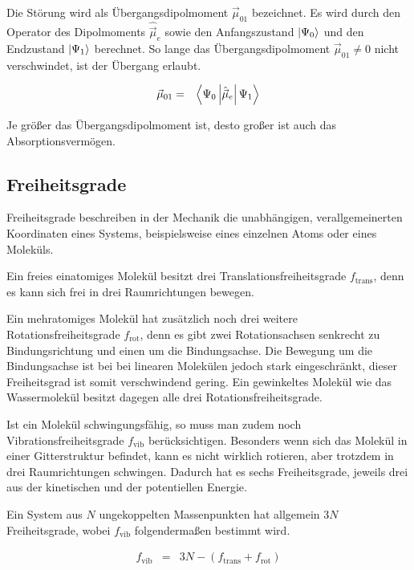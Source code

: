 \documentclass[12pt,a4paper]{scrartcl}
\numberwithin{equation}{section} %
\begin{document}
Die Störung wird als Übergangsdipolmoment $\vec\mu_{01}$ bezeichnet. Es wird durch den Operator des Dipolmoments $\hat {\vec \mu}_e$ sowie den Anfangszustand $\ket{\Psi_0}$ und den Endzustand $\ket{\Psi_1}$ berechnet. So lange das Übergangsdipolmoment $\vec\mu_{01}\neq0$ nicht verschwindet, ist der Übergang erlaubt.

\begin{eqnarray}
    \vec \mu_{01} &=& \expval{\Psi_0\left|\hat {\vec \mu}_e\right|\Psi_1}
\end{eqnarray}

\noindent
Je größer das Übergangsdipolmoment ist, desto großer ist auch das Absorptionsvermögen.

\hypertarget{freiheitsgrade}{%
\subsection{Freiheitsgrade}\label{freiheitsgrade}}

Freiheitsgrade beschreiben in der Mechanik die unabhängigen, verallgemeinerten Koordinaten eines Systems, beispielsweise eines einzelnen Atoms oder eines Moleküls.

Ein freies einatomiges Molekül besitzt drei Translationsfreiheitsgrade $f_\mathrm{trans}$, denn es kann sich frei in drei Raumrichtungen bewegen. \cite{Gerthsen}

Ein mehratomiges Molekül hat zusätzlich noch drei weitere Rotationsfreiheitsgrade $f_\mathrm{rot}$, denn es gibt zwei Rotationsachsen senkrecht zu Bindungsrichtung und einen um die Bindungsachse. Die Bewegung um die Bindungsachse ist bei bei linearen Molekülen jedoch stark eingeschränkt, dieser Freiheitsgrad ist somit verschwindend gering. \cite{Freiheitsgrad} Ein gewinkeltes Molekül wie das Wassermolekül besitzt dagegen alle drei Rotationsfreiheitsgrade. \cite{Gerthsen}

Ist ein Molekül schwingungsfähig, so muss man zudem noch Vibrationsfreiheitsgrade $f_\mathrm{vib}$ berücksichtigen. Besonders wenn sich das Molekül in einer Gitterstruktur befindet, kann es nicht wirklich rotieren, aber trotzdem in drei Raumrichtungen schwingen. Dadurch hat es sechs Freiheitsgrade, jeweils drei aus der kinetischen und der potentiellen Energie.

Ein System aus $N$ ungekoppelten Massenpunkten hat allgemein $3N$ Freiheitsgrade, wobei $f_\mathrm{vib}$ folgendermaßen bestimmt wird. \cite{Gerthsen}

\begin{eqnarray}
	 f_\mathrm{vib} &=& 3N - (f_\mathrm{trans} + f_\mathrm{rot})
\end{eqnarray}
\end{document}
